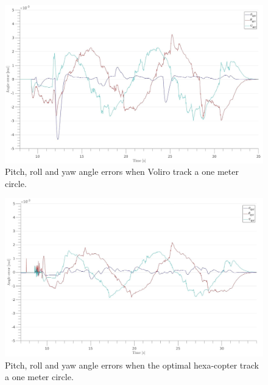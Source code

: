 \begin{figure}[!ht]
  \begin{center}
    \includegraphics[width=1.0\linewidth]{images/Voliro_circle_angle.jpg}
    \caption{Pitch, roll and yaw angle errors when Voliro track a one meter circle.}
    \label{fig:Voliro_angle_circle}
  \end{center}
\end{figure}

\begin{figure}[!ht]
  \begin{center}
    \includegraphics[width=1.0\linewidth]{images/Hexa_circle_angle.jpg}
    \caption{Pitch, roll and yaw angle errors when the optimal hexa-copter track a one meter circle.}
    \label{fig:Hexa_angle_circle}
  \end{center}
\end{figure}


